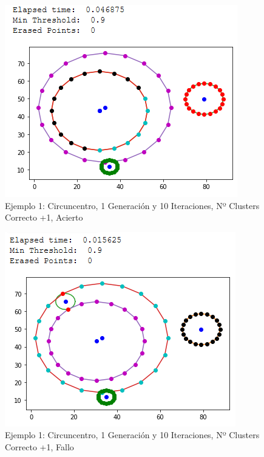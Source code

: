 \documentclass[conference,a4paper]{IEEEtran}
\begin{document}
\begin{figure}[H]
\centering
\includegraphics[scale=0.65]{Experimentacion/Ejemplo1/ej1_c_1_10_mc_correct}
\caption{Ejemplo 1: Circuncentro, 1 Generación y 10 Iteraciones,  Nº Clusters Correcto +1, Acierto\\}
\end{figure}

\begin{figure}[H]
\centering
\includegraphics[scale=0.65]{Experimentacion/Ejemplo1/ej1_c_1_10_mc_wrong}
\caption{Ejemplo 1: Circuncentro, 1 Generación y 10 Iteraciones,  Nº Clusters Correcto +1, Fallo\\}
\end{figure}
\end{document}
